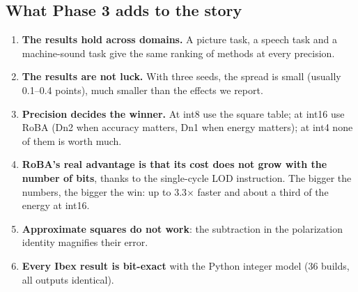 \subsection{What Phase 3 adds to the story}

\begin{enumerate}
  \item \textbf{The results hold across domains.} A picture task, a speech task and a machine-sound task give
        the same ranking of methods at every precision.
  \item \textbf{The results are not luck.} With three seeds, the spread is small (usually 0.1--0.4 points), much
        smaller than the effects we report.
  \item \textbf{Precision decides the winner.} At int8 use the square table; at int16 use RoBA (Dn2 when accuracy
        matters, Dn1 when energy matters); at int4 none of them is worth much.
  \item \textbf{RoBA's real advantage is that its cost does not grow with the number of bits}, thanks to the
        single-cycle LOD instruction. The bigger the numbers, the bigger the win: up to 3.3$\times$ faster and
        about a third of the energy at int16.
  \item \textbf{Approximate squares do not work}: the subtraction in the polarization identity magnifies their
        error.
  \item \textbf{Every Ibex result is bit-exact} with the Python integer model (36 builds, all outputs identical).
\end{enumerate}

